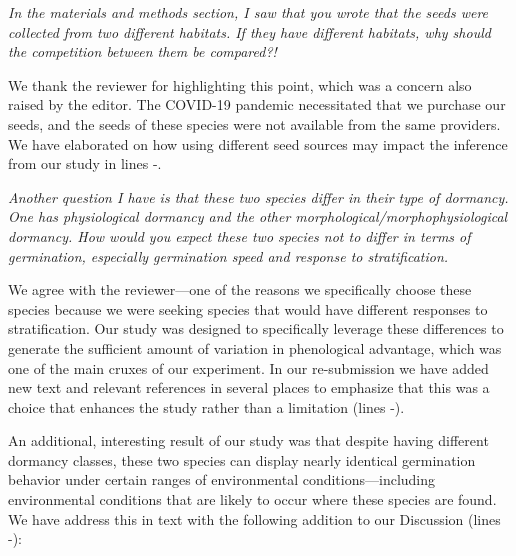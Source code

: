 \documentclass[11pt]{article}
\begin{document}
\emph{In the materials and methods section, I saw that you wrote that the seeds were collected from two different habitats. If they have different habitats, why should the competition between them be compared?!}

We thank the reviewer for highlighting this point, which was a concern also raised by the editor. The COVID-19 pandemic necessitated that we purchase our seeds, and the seeds of these species were not available from the same providers. We have elaborated on how using different seed sources may impact the inference from our study in lines -.

\emph{Another question I have is that these two species differ in their type of dormancy. One has physiological dormancy and the other morphological/morphophysiological dormancy. How would you expect these two species not to differ in terms of germination, especially germination speed and response to stratification.}

We agree with the reviewer---one of the reasons we specifically choose these species because we were seeking species that would have different responses to stratification. 
Our study was designed to specifically leverage these differences to generate the sufficient amount of variation in phenological advantage, which was one of the main cruxes of our experiment. In our re-submission we have added new text and relevant references in several places to emphasize that this was a choice that enhances the study rather than a limitation (lines -).

An additional, interesting result of our study was that despite having different dormancy classes, these two species can display nearly identical germination behavior under certain ranges of environmental conditions---including environmental conditions that are likely to occur where these species are found. We have address this in text with the following addition to our Discussion (lines -):

\end{document}
